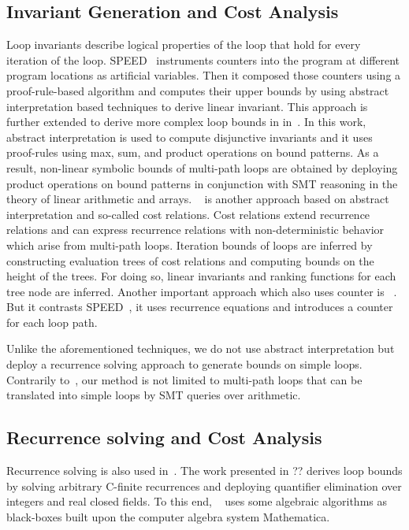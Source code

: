 \subsection{Invariant Generation and Cost Analysis} 
Loop invariants describe logical properties of the loop that hold for every iteration of the loop. 
SPEED~\cite{speed1} instruments counters into the program at different program locations as artificial variables. 
Then it composed those counters using a proof-rule-based algorithm and computes their upper bounds by using abstract interpretation based techniques to derive linear invariant. 
This approach is further extended to derive more complex loop bounds in in~\cite{Gulwani:2010:RP:1806596.1806630}. 
In this work, 
abstract interpretation is used to compute disjunctive invariants and it uses proof-rules using max, sum, and product operations on bound patterns.
As a result, non-linear symbolic bounds of multi-path loops are obtained by deploying product operations on bound patterns in conjunction with SMT reasoning in the theory of linear arithmetic and arrays. 
 ~\cite{Albert:2011:CUB:1937961.1937986} is  another approach based on abstract interpretation and so-called cost relations. 
 Cost relations extend recurrence relations and can express recurrence relations with non-deterministic behavior which arise from multi-path loops. 
 Iteration bounds of loops are inferred by constructing evaluation trees of cost relations and computing bounds on the height of the trees. 
 For doing so, linear invariants and ranking functions for each tree node are inferred. 
 Another important approach which also uses counter is ~\cite{Knoop:2011:SLB:2341512.2341532}. But it contrasts SPEED~\cite{speed1}, it uses recurrence equations and introduces a counter for each loop path. 
 
 Unlike the aforementioned techniques, we do not use abstract interpretation but deploy a recurrence solving approach to generate bounds on simple loops. 
 Contrarily to~\cite{speed1,Gulwani:2010:RP:1806596.1806630,Albert:2011:CUB:1937961.1937986}, our method is not limited to multi-path loops that can be translated into simple loops by SMT queries over arithmetic.



\subsection{Recurrence solving and Cost Analysis} 
Recurrence solving is also used in~\cite{10.1007/978-3-642-17511-4_7,Henzinger:2008:VVT:1484209.1484240}.
The work presented in ?? derives loop bounds by solving arbitrary C-finite recurrences and deploying quantifier elimination over integers and real closed fields. 
To this end, ~\cite{Henzinger:2008:VVT:1484209.1484240} uses some algebraic algorithms as black-boxes built upon the computer algebra system Mathematica. 

